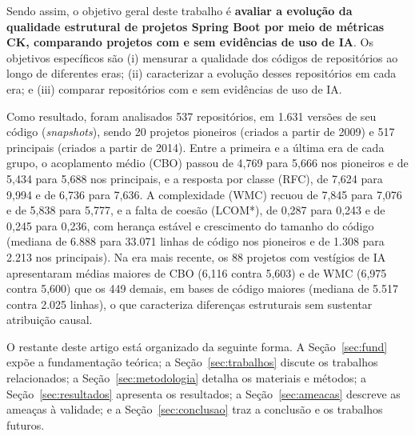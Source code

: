 Sendo assim, o objetivo geral deste trabalho é \textbf{avaliar a evolução da qualidade estrutural de projetos Spring Boot por meio de métricas CK, comparando projetos com e sem evidências de uso de IA}. Os objetivos específicos são (i) mensurar a qualidade dos códigos de repositórios ao longo de diferentes eras; (ii) caracterizar a evolução desses repositórios em cada era; e (iii) comparar repositórios com e sem evidências de uso de IA.

Como resultado, foram analisados 537 repositórios, em 1.631 versões de seu código (\emph{snapshots}), sendo 20 projetos pioneiros (criados a partir de 2009) e 517 principais (criados a partir de 2014). Entre a primeira e a última era de cada grupo, o acoplamento médio (CBO) passou de 4,769 para 5,666 nos pioneiros e de 5,434 para 5,688 nos principais, e a resposta por classe (RFC), de 7,624 para 9,994 e de 6,736 para 7,636. A complexidade (WMC) recuou de 7,845 para 7,076 e de 5,838 para 5,777, e a falta de coesão (LCOM*), de 0,287 para 0,243 e de 0,245 para 0,236, com herança estável e crescimento do tamanho do código (mediana de 6.888 para 33.071 linhas de código nos pioneiros e de 1.308 para 2.213 nos principais). Na era mais recente, os 88 projetos com vestígios de IA apresentaram médias maiores de CBO (6,116 contra 5,603) e de WMC (6,975 contra 5,600) que os 449 demais, em bases de código maiores (mediana de 5.517 contra 2.025 linhas), o que caracteriza diferenças estruturais sem sustentar atribuição causal.

O restante deste artigo está organizado da seguinte forma. A Seção~\ref{sec:fund} expõe a fundamentação teórica; a Seção~\ref{sec:trabalhos} discute os trabalhos relacionados; a Seção~\ref{sec:metodologia} detalha os materiais e métodos; a Seção~\ref{sec:resultados} apresenta os resultados; a Seção~\ref{sec:ameacas} descreve as ameaças à validade; e a Seção~\ref{sec:conclusao} traz a conclusão e os trabalhos futuros.

